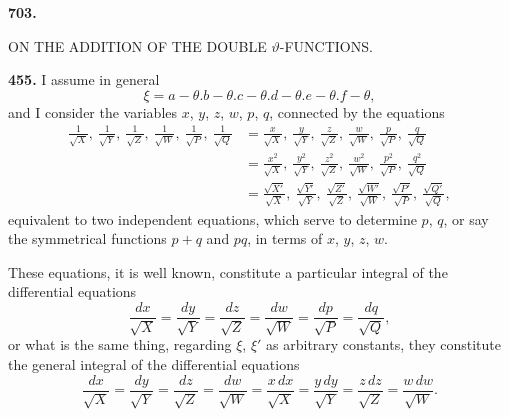\documentclass[12pt,a4paper]{article}
\theoremstyle{definition}
\begin{document}
\vspace{2em}

\begin{center}
\large\bfseries 703.\par\vspace{0.3em}
ON THE ADDITION OF THE DOUBLE $\vartheta$-FUNCTIONS.\par\vspace{0.5em}
\normalsize{}
\end{center}

\vspace{1em}

\noindent\textbf{455.}\quad
I assume in general
\[
\xi = a - \theta . b - \theta . c - \theta . d - \theta . e - \theta . f - \theta,
\]
and I consider the variables $x$, $y$, $z$, $w$, $p$, $q$, connected by the equations
\begin{align*}
\frac{1}{\sqrt{X}},\ \frac{1}{\sqrt{Y}},\ \frac{1}{\sqrt{Z}},\ \frac{1}{\sqrt{W}},\ \frac{1}{\sqrt{P}},\ \frac{1}{\sqrt{Q}} &=
\frac{x}{\sqrt{X}},\ \frac{y}{\sqrt{Y}},\ \frac{z}{\sqrt{Z}},\ \frac{w}{\sqrt{W}},\ \frac{p}{\sqrt{P}},\ \frac{q}{\sqrt{Q}} \\
&= \frac{x^2}{\sqrt{X}},\ \frac{y^2}{\sqrt{Y}},\ \frac{z^2}{\sqrt{Z}},\ \frac{w^2}{\sqrt{W}},\ \frac{p^2}{\sqrt{P}},\ \frac{q^2}{\sqrt{Q}} \\
&= \frac{\sqrt{X'}}{\sqrt{X}},\ \frac{\sqrt{Y'}}{\sqrt{Y}},\ \frac{\sqrt{Z'}}{\sqrt{Z}},\ \frac{\sqrt{W'}}{\sqrt{W}},\ \frac{\sqrt{P'}}{\sqrt{P}},\ \frac{\sqrt{Q'}}{\sqrt{Q}},
\end{align*}
equivalent to two independent equations, which serve to determine $p$, $q$, or say the symmetrical functions $p + q$ and $pq$, in terms of $x$, $y$, $z$, $w$.

These equations, it is well known, constitute a particular integral of the differential equations
\[
\frac{dx}{\sqrt{X}} = \frac{dy}{\sqrt{Y}} = \frac{dz}{\sqrt{Z}} = \frac{dw}{\sqrt{W}} = \frac{dp}{\sqrt{P}} = \frac{dq}{\sqrt{Q}},
\]
or what is the same thing, regarding $\xi$, $\xi'$ as arbitrary constants, they constitute the general integral of the differential equations
\[
\frac{dx}{\sqrt{X}} = \frac{dy}{\sqrt{Y}} = \frac{dz}{\sqrt{Z}} = \frac{dw}{\sqrt{W}} = \frac{x\,dx}{\sqrt{X}} = \frac{y\,dy}{\sqrt{Y}} = \frac{z\,dz}{\sqrt{Z}} = \frac{w\,dw}{\sqrt{W}}.
\]
\end{document}
